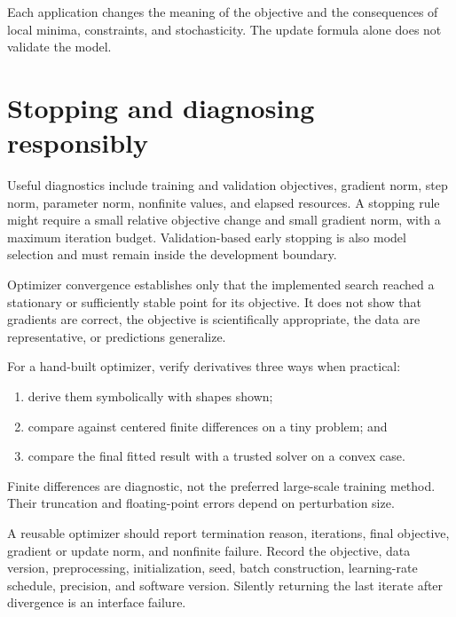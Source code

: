 Each application changes the meaning of the objective and the consequences of
local minima, constraints, and stochasticity. The update formula alone does not
validate the model.

\section{Stopping and diagnosing responsibly}

Useful diagnostics include training and validation objectives, gradient norm,
step norm, parameter norm, nonfinite values, and elapsed resources. A stopping
rule might require a small relative objective change and small gradient norm,
with a maximum iteration budget. Validation-based early stopping is also model
selection and must remain inside the development boundary.

\begin{warningbox}
Optimizer convergence establishes only that the implemented search reached a
stationary or sufficiently stable point for its objective. It does not show
that gradients are correct, the objective is scientifically appropriate, the
data are representative, or predictions generalize.
\end{warningbox}

For a hand-built optimizer, verify derivatives three ways when practical:

\begin{enumerate}
  \item derive them symbolically with shapes shown;
  \item compare against centered finite differences on a tiny problem; and
  \item compare the final fitted result with a trusted solver on a convex case.
\end{enumerate}

Finite differences are diagnostic, not the preferred large-scale training
method. Their truncation and floating-point errors depend on perturbation size.

\begin{professionalbox}
A reusable optimizer should report termination reason, iterations, final
objective, gradient or update norm, and nonfinite failure. Record the objective,
data version, preprocessing, initialization, seed, batch construction,
learning-rate schedule, precision, and software version. Silently returning the
last iterate after divergence is an interface failure.
\end{professionalbox}

